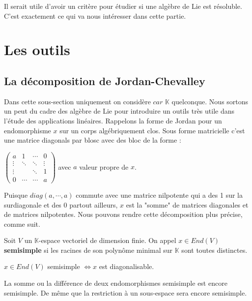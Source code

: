 \documentclass[a4paper,openany,12pt]{report}
\newcommand{\KK}{\mathbb{K}}
\theoremstyle{break}
{\theorembodyfont{\upshape}
\newtheorem*{rmq}{Remarque :}
\newtheorem*{prv}{Preuve :}
\newtheorem*{ex}{Exemples :}
\newtheorem*{exe}{Exemple : }
\newtheorem*{nota}{Notation :}
\newtheorem*{dem}{D\'emonstration :}}
\begin{document}
\quad Il serait utile d'avoir un critère pour étudier si une algèbre de Lie est résoluble. C'est exactement ce qui va nous intéresser dans cette partie. 

\section{Les outils}

\subsection{La décomposition de Jordan-Chevalley}

\quad Dans cette sous-section uniquement on considère $car$ $\KK$ quelconque. Nous sortons un peut du cadre des algèbre de Lie pour introduire un outils très utile dans l’étude des applications linéaires. Rappelons la forme de Jordan pour un endomorphisme $x$ sur un corps algébriquement clos. Sous forme matricielle c'est une matrice diagonals par blosc avec des bloc de la forme :
\begin{center}
$
\begin{pmatrix}
a & 1 & \cdots & 0 \\
\vdots & \ddots & \ddots & \vdots \\
 \vdots & & \ddots & 1 \\
0 & \cdots & \cdots & a
\end{pmatrix}
$ avec $a$ valeur propre de $x$.
\end{center}
\quad Puisque $diag(a, \cdots, a)$ commute avec une matrice nilpotente qui a des 1 sur la surdiagonale et des 0 partout ailleurs, $x$ est la "somme" de matrices diagonales et de matrices nilpotentes. Nous pouvons rendre cette décomposition plus précise, comme suit. 

\begin{df}
\quad Soit $V$ un $\KK$-espace vectoriel de dimension finie. On appel $x \in End(V)$ \textbf{semisimple} si les racines de son polynôme minimal sur $\KK$ sont toutes distinctes. 
\end{df}

\begin{prop}
\quad $x \in End(V)$ semisimple $\iff x$ est diagonalisable. 
\end{prop}

\begin{rmq}
\quad La somme ou la différence de deux endomorphismes semisimple est encore semisimple. De même que la restriction à un sous-espace sera encore semisimple.
\end{rmq}
\end{document}
